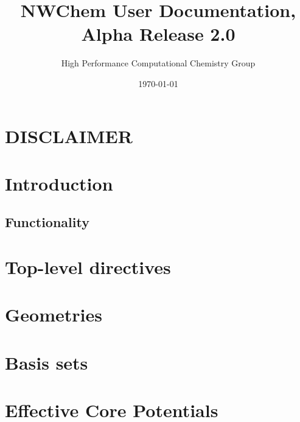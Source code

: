 
\setlength{\parskip}{6pt}

\newcommand{\nwchemversion}{2.0}
\newcommand{\nwchemyear}{1996}

\newcommand{\angstrom}{{\AA}ngstr{\o}m}





\title{\bf\Large NWChem User Documentation, Alpha Release \nwchemversion}
\author{High Performance Computational Chemistry Group}
\date{\today}
\maketitle

\section*{\center DISCLAIMER}


\clearpage

\tableofcontents

\clearpage

\section{Introduction}


\subsection{Functionality}


\section{Top-level directives}


\section{Geometries}


\section{Basis sets}


\section{Effective Core Potentials}


